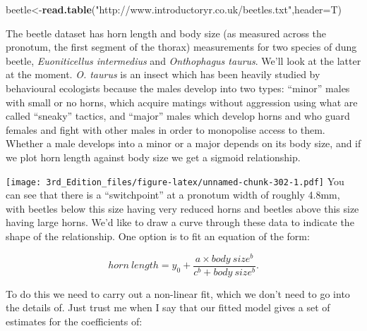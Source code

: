 \documentclass[
]{book}
\newenvironment{Shaded}{\begin{snugshade}}{\end{snugshade}}
\newcommand{\DataTypeTok}[1]{\textcolor[rgb]{0.13,0.29,0.53}{#1}}
\newcommand{\KeywordTok}[1]{\textcolor[rgb]{0.13,0.29,0.53}{\textbf{#1}}}
\newcommand{\NormalTok}[1]{#1}
\newcommand{\OperatorTok}[1]{\textcolor[rgb]{0.81,0.36,0.00}{\textbf{#1}}}
\newcommand{\StringTok}[1]{\textcolor[rgb]{0.31,0.60,0.02}{#1}}
\begin{document}
\begin{Shaded}
\begin{Highlighting}[]
\NormalTok{beetle<-}\KeywordTok{read.table}\NormalTok{(}\StringTok{"http://www.introductoryr.co.uk/beetles.txt"}\NormalTok{,}\DataTypeTok{header=}\NormalTok{T)}
\end{Highlighting}
\end{Shaded}

The beetle dataset has horn length and body size (as measured across the pronotum, the first segment of the thorax) measurements for two species of dung beetle, \emph{Euoniticellus intermedius} and \emph{Onthophagus taurus}. We'll look at the latter at the moment. \emph{O. taurus} is an insect which has been heavily studied by behavioural ecologists because the males develop into two types: ``minor'' males with small or no horns, which acquire matings without aggression using what are called ``sneaky'' tactics, and ``major'' males which develop horns and who guard females and fight with other males in order to monopolise access to them. Whether a male develops into a minor or a major depends on its body size, and if we plot horn length against body size we get a sigmoid relationship.

\begin{Shaded}
\end{Shaded}

\texttt{[image: 3rd\_Edition\_files/figure-latex/unnamed-chunk-302-1.pdf]}
You can see that there is a ``switchpoint'' at a pronotum width of roughly 4.8mm, with beetles below this size having very reduced horns and beetles above this size having large horns. We'd like to draw a curve through these data to indicate the shape of the relationship. One option is to fit an equation of the form:

\[ horn \: length  = y_{0} + \frac{a \times body \: size^{b}}{c^{b} + body \: size^{b}}. \]

To do this we need to carry out a non-linear fit, which we don't need to go into the details of. Just trust me when I say that our fitted model gives a set of estimates for the coefficients of:
\end{document}
